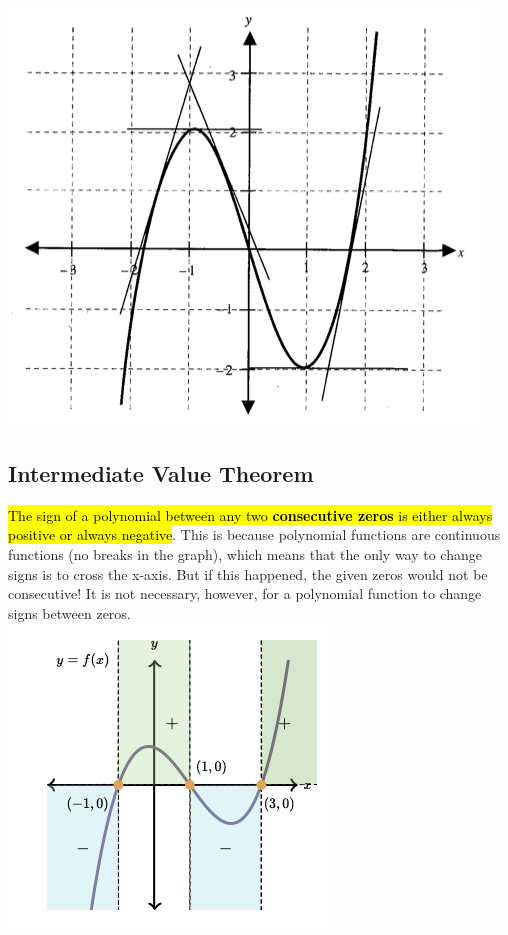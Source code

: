 \documentclass{book}
\begin{document}
	\includegraphics[scale=0.6]{turningpoint}
	
	\subsection{Intermediate Value Theorem}
	\hl{The sign of a polynomial between any two \textbf{consecutive zeros} is either always positive or always negative}. This is because polynomial functions are continuous functions (no breaks in the graph), which means that the only way to change signs is to cross the x-axis. But if this happened, the given zeros would not be consecutive! It is not necessary, however, for a polynomial function to change signs between zeros.
	\\
	
	\includegraphics[scale=0.5]{pinterval1}
	
\end{document}
